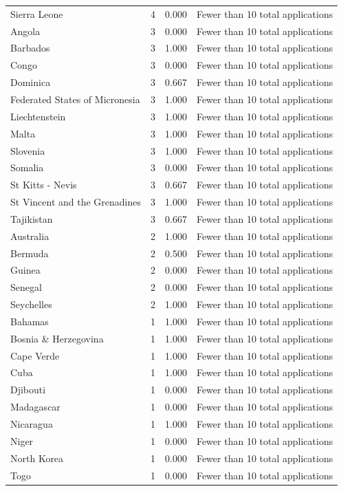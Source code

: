 \documentclass[runningheads]{llncs}
\begin{document}
{\begin{longtable}{p{}rrp{}}
Sierra Leone & 4 & 0.000 & Fewer than 10 total applications \\
Angola & 3 & 0.000 & Fewer than 10 total applications \\
Barbados & 3 & 1.000 & Fewer than 10 total applications \\
Congo & 3 & 0.000 & Fewer than 10 total applications \\
Dominica & 3 & 0.667 & Fewer than 10 total applications \\
Federated States of Micronesia & 3 & 1.000 & Fewer than 10 total applications \\
Liechtenstein & 3 & 1.000 & Fewer than 10 total applications \\
Malta & 3 & 1.000 & Fewer than 10 total applications \\
Slovenia & 3 & 1.000 & Fewer than 10 total applications \\
Somalia & 3 & 0.000 & Fewer than 10 total applications \\
St Kitts - Nevis & 3 & 0.667 & Fewer than 10 total applications \\
St Vincent and the Grenadines & 3 & 1.000 & Fewer than 10 total applications \\
Tajikistan & 3 & 0.667 & Fewer than 10 total applications \\
Australia & 2 & 1.000 & Fewer than 10 total applications \\
Bermuda & 2 & 0.500 & Fewer than 10 total applications \\
Guinea & 2 & 0.000 & Fewer than 10 total applications \\
Senegal & 2 & 0.000 & Fewer than 10 total applications \\
Seychelles & 2 & 1.000 & Fewer than 10 total applications \\
Bahamas & 1 & 1.000 & Fewer than 10 total applications \\
Bosnia \& Herzegovina & 1 & 1.000 & Fewer than 10 total applications \\
Cape Verde & 1 & 1.000 & Fewer than 10 total applications \\
Cuba & 1 & 1.000 & Fewer than 10 total applications \\
Djibouti & 1 & 0.000 & Fewer than 10 total applications \\
Madagascar & 1 & 0.000 & Fewer than 10 total applications \\
Nicaragua & 1 & 1.000 & Fewer than 10 total applications \\
Niger & 1 & 0.000 & Fewer than 10 total applications \\
North Korea & 1 & 0.000 & Fewer than 10 total applications \\
Togo & 1 & 0.000 & Fewer than 10 total applications \\
\hline
\end{longtable}
}
\end{document}
